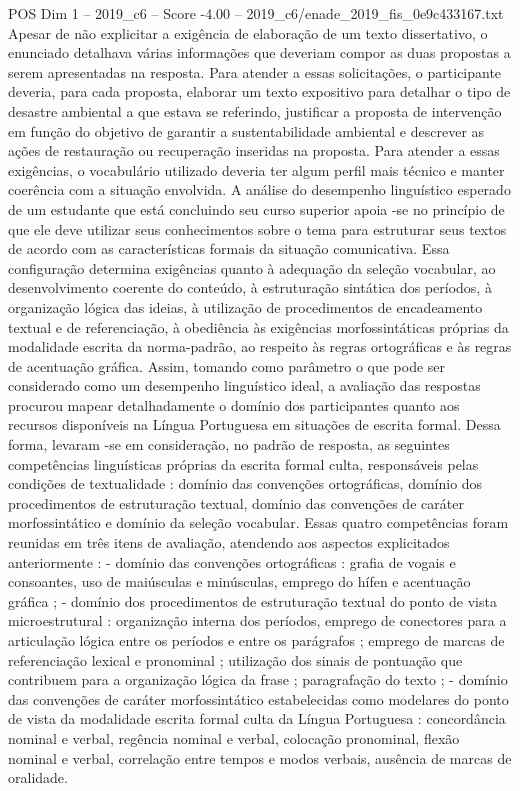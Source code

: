 \begin{textsample}{POS Dim 1 – 2019\_c6 – Score -4.00 – 2019\_c6/enade\_2019\_fis\_0e9c433167.txt}
Apesar de não explicitar a exigência de elaboração de um texto dissertativo, o enunciado detalhava várias informações que deveriam compor as duas propostas a serem apresentadas na resposta.
Para atender a essas solicitações, o participante deveria, para cada proposta, elaborar um texto expositivo para detalhar o tipo de desastre ambiental a que estava se referindo, justificar a proposta de intervenção em função do objetivo de garantir a sustentabilidade ambiental e descrever as ações de restauração ou recuperação inseridas na proposta.
Para atender a essas exigências, o vocabulário utilizado deveria ter algum perfil mais técnico e manter coerência com a situação envolvida.
A análise do desempenho linguístico esperado de um estudante que está concluindo seu curso superior apoia -se no princípio de que ele deve utilizar seus conhecimentos sobre o tema para estruturar seus textos de acordo com as características formais da situação comunicativa.
Essa configuração determina exigências quanto à adequação da seleção vocabular, ao desenvolvimento coerente do conteúdo, à estruturação sintática dos períodos, à organização lógica das ideias, à utilização de procedimentos de encadeamento textual e de referenciação, à obediência às exigências morfossintáticas próprias da modalidade escrita da norma-padrão, ao respeito às regras ortográficas e às regras de acentuação gráfica.
Assim, tomando como parâmetro o que pode ser considerado como um desempenho linguístico ideal, a avaliação das respostas procurou mapear detalhadamente o domínio dos participantes quanto aos recursos disponíveis na Língua Portuguesa em situações de escrita formal.
Dessa forma, levaram -se em consideração, no padrão de resposta, as seguintes competências linguísticas próprias da escrita formal culta, responsáveis pelas condições de textualidade : domínio das convenções ortográficas, domínio dos procedimentos de estruturação textual, domínio das convenções de caráter morfossintático e domínio da seleção vocabular.
Essas quatro competências foram reunidas em três itens de avaliação, atendendo aos aspectos explicitados anteriormente : - domínio das convenções ortográficas : grafia de vogais e consoantes, uso de maiúsculas e minúsculas, emprego do hífen e acentuação gráfica ; - domínio dos procedimentos de estruturação textual do ponto de vista microestrutural : organização interna dos períodos, emprego de conectores para a articulação lógica entre os períodos e entre os parágrafos ; emprego de marcas de referenciação lexical e pronominal ; utilização dos sinais de pontuação que contribuem para a organização lógica da frase ; paragrafação do texto ; - domínio das convenções de caráter morfossintático estabelecidas como modelares do ponto de vista da modalidade escrita formal culta da Língua Portuguesa : concordância nominal e verbal, regência nominal e verbal, colocação pronominal, flexão nominal e verbal, correlação entre tempos e modos verbais, ausência de marcas de oralidade.

\end{textsample}
